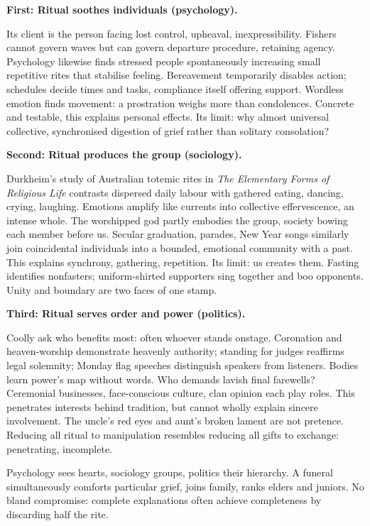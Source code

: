 \textbf{First: Ritual soothes individuals (psychology).}

Its client is the person facing lost control, upheaval, inexpressibility. Fishers cannot govern waves but can govern departure procedure, retaining agency. Psychology likewise finds stressed people spontaneously increasing small repetitive rites that stabilise feeling. Bereavement temporarily disables action; schedules decide times and tasks, compliance itself offering support. Wordless emotion finds movement: a prostration weighs more than condolences. Concrete and testable, this explains personal effects. Its limit: why almost universal collective, synchronised digestion of grief rather than solitary consolation?

\textbf{Second: Ritual produces the group (sociology).}

Durkheim's study of Australian totemic rites in \textit{The Elementary Forms of Religious Life} contrasts dispersed daily labour with gathered eating, dancing, crying, laughing. Emotions amplify like currents into collective effervescence, an intense whole. The worshipped god partly embodies the group, society bowing each member before us. Secular graduation, parades, New Year songs similarly join coincidental individuals into a bounded, emotional community with a past. This explains synchrony, gathering, repetition. Its limit: us creates them. Fasting identifies nonfasters; uniform-shirted supporters sing together and boo opponents. Unity and boundary are two faces of one stamp.

\textbf{Third: Ritual serves order and power (politics).}

Coolly ask who benefits most: often whoever stands onstage. Coronation and heaven-worship demonstrate heavenly authority; standing for judges reaffirms legal solemnity; Monday flag speeches distinguish speakers from listeners. Bodies learn power's map without words. Who demands lavish final farewells? Ceremonial businesses, face-conscious culture, clan opinion each play roles. This penetrates interests behind tradition, but cannot wholly explain sincere involvement. The uncle's red eyes and aunt's broken lament are not pretence. Reducing all ritual to manipulation resembles reducing all gifts to exchange: penetrating, incomplete.

Psychology sees hearts, sociology groups, politics their hierarchy. A funeral simultaneously comforts particular grief, joins family, ranks elders and juniors. No bland compromise: complete explanations often achieve completeness by discarding half the rite.


